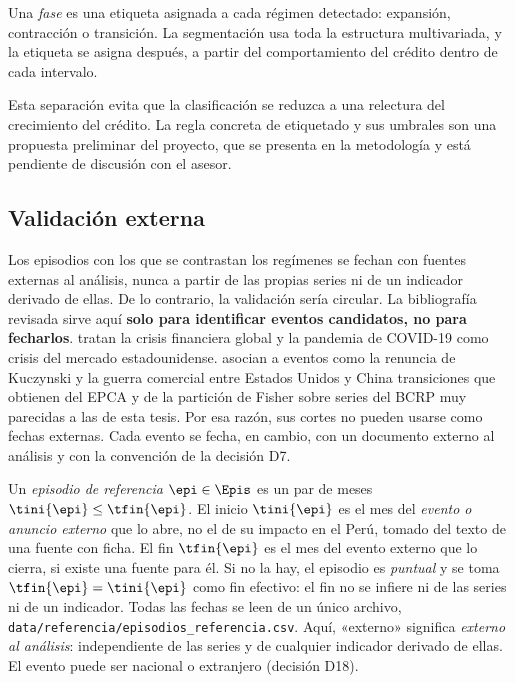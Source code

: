 \begin{definicion}[Fase]\label{def:fase}
Una \emph{fase} es una etiqueta asignada a cada régimen detectado: expansión, contracción o
transición. La segmentación usa toda la estructura multivariada, y la etiqueta se asigna después,
a partir del comportamiento del crédito dentro de cada intervalo.
\end{definicion}

Esta separación evita que la clasificación se reduzca a una relectura del crecimiento del
crédito. La regla concreta de etiquetado y sus umbrales son una propuesta preliminar del
proyecto, que se presenta en la metodología y está pendiente de discusión con el asesor.

\subsection{Validación externa}
\label{sec:validacion}

Los episodios con los que se contrastan los regímenes se fechan con fuentes externas al análisis,
nunca a partir de las propias series ni de un indicador derivado de ellas. De lo contrario, la
validación sería circular. La bibliografía revisada sirve aquí \textbf{solo para identificar
eventos candidatos, no para fecharlos}. \textcite{tuhin_et_al_2025} tratan la crisis financiera
global y la pandemia de COVID-19 como crisis del mercado estadounidense.
\textcite{camiz_cerda_atoche_2026} asocian a eventos como la renuncia de Kuczynski y la guerra
comercial entre Estados Unidos y China transiciones que obtienen del EPCA y de la partición de
Fisher sobre series del BCRP muy parecidas a las de esta tesis. Por esa razón, sus cortes no
pueden usarse como fechas externas. Cada evento se fecha, en cambio, con un documento externo al
análisis y con la convención de la decisión D7.

\begin{definicion}\label{def:episodio}
Un \emph{episodio de referencia} $\epi\in\Epis$ es un par de meses $\tini{\epi}\le\tfin{\epi}$.
El inicio $\tini{\epi}$ es el mes del \emph{evento o anuncio externo} que lo abre, no el de su
impacto en el Perú, tomado del texto de una fuente con ficha. El fin $\tfin{\epi}$ es el mes del
evento externo que lo cierra, si existe una fuente para él. Si no la hay, el episodio es
\emph{puntual} y se toma $\tfin{\epi}=\tini{\epi}$ como fin efectivo: el fin no se infiere ni de las
series ni de un indicador. Todas las fechas se leen de un único archivo,
\texttt{data/referencia/episodios\_referencia.csv}. Aquí, «externo» significa \emph{externo al
análisis}: independiente de las series y de cualquier indicador derivado de ellas. El evento puede
ser nacional o extranjero (decisión D18).
\end{definicion}

